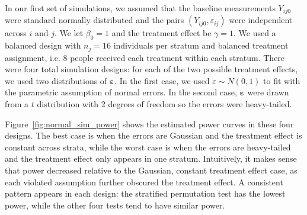 \documentclass[11pt]{article}
\begin{document}
In our first set of simulations, we assumed that the baseline measurements $Y_{ij0}$ were standard normally distributed and the pairs $(Y_{ij0}, \varepsilon_{ij})$ were independent across $i$ and $j$.
We let $\beta_0 = 1$ and the treatment effect be $\gamma = 1$.
We used a balanced design with $n_j = 16$ individuals per stratum and balanced treatment assignment, i.e. 8 people received each treatment within each stratum.
There were four total simulation designs:
for each of the two possible treatment effects, we used two distributions of $\mathbf{\varepsilon}$.
In the first case, we used $\varepsilon \sim N(0, 1)$ to fit with the parametric assumption of normal errors.
In the second case, $\mathbf{\varepsilon}$ were drawn from a $t$ distribution with 2 degrees of freedom so the errors were heavy-tailed.

Figure~\ref{fig:normal_sim_power} shows the estimated power curves in these four designs.
The best case is when the errors are Gaussian and the treatment effect is constant across strata, while the worst case is when the errors are heavy-tailed and the treatment effect only appears in one stratum.
Intuitively, it makes sense that power decreased relative to the Gaussian, constant treatment effect case, as each violated assumption further obscured the treatment effect.
A consistent pattern appears in each design: the stratified permutation test has the lowest power, while the other four tests tend to have similar power.
\end{document}
